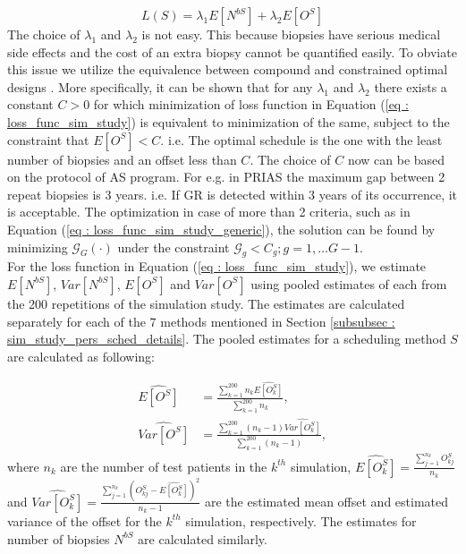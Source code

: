 \begin{equation}
\label{eq : loss_func_sim_study}
L(S) = \lambda_1 E[N^{bS}] + \lambda_2 E[O^S] 
\end{equation}
The choice of $\lambda_1$ and $\lambda_2$ is not easy. This because biopsies have serious medical side effects and the cost of an extra biopsy cannot be quantified easily. To obviate this issue we utilize the equivalence between compound and constrained optimal designs \citep{cook1994equivalence}. More specifically, it can be shown that for any $\lambda_1$ and $\lambda_2$ there exists a constant $C>0$ for which minimization of loss function in Equation (\ref{eq : loss_func_sim_study}) is equivalent to minimization of the same, subject to the constraint that $E[O^S] < C$. i.e. The optimal schedule is the one with the least number of biopsies and an offset less than $C$. The choice of $C$ now can be based on the protocol of AS program. For e.g. in PRIAS the maximum gap between 2 repeat biopsies is 3 years. i.e. If GR is detected within 3 years of its occurrence, it is acceptable. The optimization in case of more than 2 criteria, such as in Equation (\ref{eq : loss_func_sim_study_generic}), the solution can be found by minimizing $\mathcal{G}_G(\cdot)$ under the constraint $\mathcal{G}_g < C_g; g=1, \ldots G-1$.\\

For the loss function in Equation (\ref{eq : loss_func_sim_study}), we estimate $E[N^{bS}]$, $Var[N^{bS}]$, $E[O^S]$ and $Var[O^S]$ using pooled estimates of each from the 200 repetitions of the simulation study. The estimates are calculated separately for each of the 7 methods mentioned in Section \ref{subsubsec : sim_study_pers_sched_details}. The pooled estimates for a scheduling method $S$ are calculated as following:

\begin{align*}
\widehat{E[O^S]} &= \frac{\sum_{k=1}^{200} n_k \widehat{E[O^S_k]}}{\sum_{k=1}^{200} n_k}, \\
\widehat{Var[O^S]} &= \frac{\sum_{k=1}^{200} (n_k - 1) \widehat{Var[O^S_k]}}{\sum_{k=1}^{200} (n_k-1)}, 
\end{align*}
where $n_k$ are the number of test patients in the $k^{th}$ simulation, $\widehat{E[O^S_k]} = \frac{\sum_{j=1}^{n_k}O^S_{kj}}{n_k}$ and $\widehat{Var[O^S_k]} = \frac{\sum_{j=1}^{n_k}(O^S_{kj} - \widehat{E[O^S_k]})^2}{n_k-1}$ are the estimated mean offset and estimated variance of the offset for the $k^{th}$ simulation, respectively. The estimates for number of biopsies $N^{bS}$ are calculated similarly.

